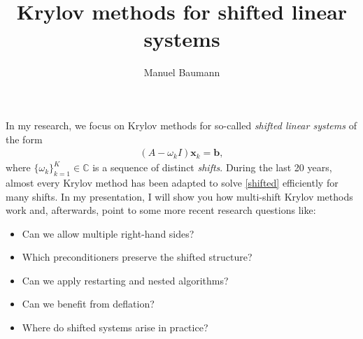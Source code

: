\documentclass{article}
\title{Krylov methods for shifted linear systems}
\author{Manuel Baumann}
\affil{PhD student at TU Delft}
\date{}
\begin{document}
\maketitle
\setcounter{page}{4}
In my research, we focus on Krylov methods for so-called \textit{shifted linear systems} of the form
\begin{align}
\label{shifted}
 (A - \omega_k I) \mathbf{x}_k = \mathbf{b},
\end{align}
where $\{\omega_k\}_{k=1}^K \in \mathbb{C}$ is a sequence of distinct \textit{shifts}. During the last 20 years, almost every Krylov method has been adapted to solve \eqref{shifted} efficiently for many shifts. In my presentation, I will show you how multi-shift Krylov methods work and, afterwards, point to some more recent research questions like:
\begin{itemize}
 \item Can we allow multiple right-hand sides?
 \item Which preconditioners preserve the shifted structure?
 \item Can we apply restarting and nested algorithms?
 \item Can we benefit from deflation?
 \item Where do shifted systems arise in practice?
\end{itemize}
\end{document}
